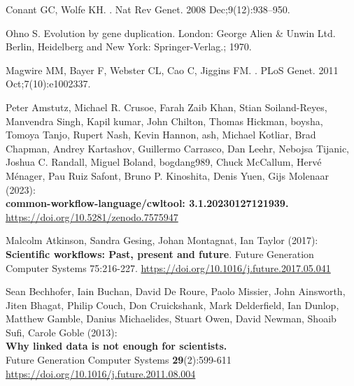 \documentclass[10pt,letterpaper]{article}
\begin{document}
\nolinenumbers

%
%
% 
\begin{thebibliography}{10}

Conant GC, Wolfe KH.
.
\newblock Nat Rev Genet. 2008 Dec;9(12):938--950.

Ohno S.
\newblock Evolution by gene duplication.
\newblock London: George Alien \& Unwin Ltd. Berlin, Heidelberg and New York:
  Springer-Verlag.; 1970.

Magwire MM, Bayer F, Webster CL, Cao C, Jiggins FM.
.
\newblock PLoS Genet. 2011 Oct;7(10):e1002337.





 Peter Amstutz, Michael R. Crusoe, Farah Zaib Khan,
Stian Soiland-Reyes, Manvendra Singh, Kapil kumar, John Chilton, Thomas
Hickman, boysha, Tomoya Tanjo, Rupert Nash, Kevin Hannon, ash, Michael
Kotliar, Brad Chapman, Andrey Kartashov, Guillermo Carrasco, Dan Leehr,
Nebojsa Tijanic, Joshua C. Randall, Miguel Boland, bogdang989, Chuck
McCallum, Hervé Ménager, Pau Ruiz Safont, Bruno P. Kinoshita, Denis
Yuen, Gijs Molenaar (2023):\\
\textbf{common-workflow-language/cwltool: 3.1.20230127121939.}\\
\url{https://doi.org/10.5281/zenodo.7575947}

 Malcolm Atkinson, Sandra Gesing, Johan Montagnat,
Ian Taylor (2017): \textbf{Scientific workflows: Past, present and
future}. Future Generation Computer Systems 75:216-227.
\url{https://doi.org/10.1016/j.future.2017.05.041}

 Sean Bechhofer, Iain Buchan, David De Roure, Paolo
Missier, John Ainsworth, Jiten Bhagat, Philip Couch, Don Cruickshank,
Mark Delderfield, Ian Dunlop, Matthew Gamble, Danius Michaelides, Stuart
Owen, David Newman, Shoaib Sufi, Carole Goble (2013):\\
\textbf{Why linked data is not enough for scientists.}\\
Future Generation Computer Systems \textbf{29}(2):599-611\\
\url{https://doi.org/10.1016/j.future.2011.08.004}


\end{thebibliography}
\end{document}
